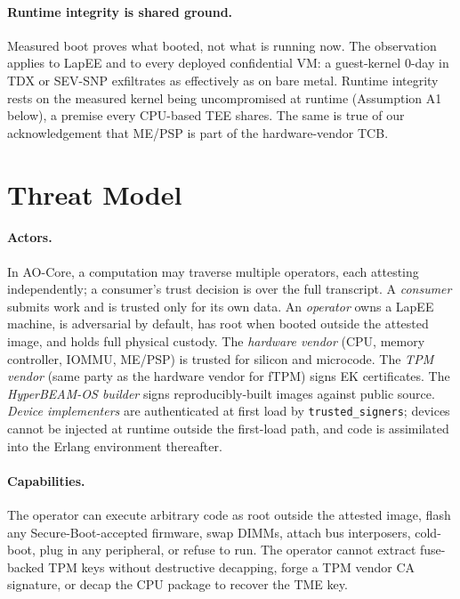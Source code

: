 \documentclass[10pt,a4paper]{article}
\begin{document}
\paragraph{Runtime integrity is shared ground.} Measured boot proves what
booted, not what is running now. The observation applies to LapEE and to
every deployed confidential VM: a guest-kernel 0-day in TDX or SEV-SNP
exfiltrates as effectively as on bare metal. Runtime integrity rests on the
measured kernel being uncompromised at runtime (Assumption A1 below), a
premise every CPU-based TEE shares. The same is true of our
acknowledgement that ME/PSP is part of the hardware-vendor TCB.

\vspace{-0.3em}
\section{Threat Model}
\label{sec:threatmodel}
\vspace{-0.3em}

\paragraph{Actors.} In AO-Core, a computation may traverse multiple
operators, each attesting independently; a consumer's trust decision is
over the full transcript. A \emph{consumer} submits work and is trusted
only for its own data. An \emph{operator} owns a LapEE machine, is
adversarial by default, has root when booted outside the attested image,
and holds full physical custody. The \emph{hardware vendor} (CPU, memory
controller, IOMMU, ME/PSP) is trusted for silicon and microcode. The
\emph{TPM vendor} (same party as the hardware vendor for fTPM) signs EK
certificates. The \emph{HyperBEAM-OS builder} signs reproducibly-built
images against public source. \emph{Device implementers} are authenticated
at first load by \texttt{trusted\_signers}; devices cannot be injected at
runtime outside the first-load path, and code is assimilated into the
Erlang environment thereafter.

\paragraph{Capabilities.} The operator can execute arbitrary code as root
outside the attested image, flash any Secure-Boot-accepted firmware, swap
DIMMs, attach bus interposers, cold-boot, plug in any peripheral, or refuse
to run. The operator cannot extract fuse-backed TPM keys without
destructive decapping, forge a TPM vendor CA signature, or decap the CPU
package to recover the TME key.
\end{document}
